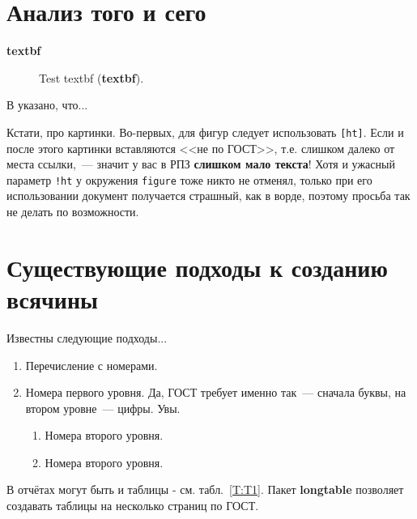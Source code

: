 \documentclass[utf8]{G7-32} %
\newcommand{\Code}[1]{\textbf{#1}}
\begin{document}
\section{Анализ того и сего}

\textbf{textbf}

\begin{figure}
\centering
\caption{Test textbf (\textbf{textbf}).}
\label{fig:dia}
\end{figure}


В \cite{Pup99} указано, что...

Кстати, про картинки. Во-первых, для фигур следует использовать \texttt{[ht]}. Если и после этого картинки вставляются <<не по ГОСТ>>, т.е. слишком далеко от места ссылки,~--- значит у вас в РПЗ \textbf{слишком мало текста}! Хотя и ужасный параметр \texttt{!ht} у окружения \texttt{figure} тоже никто не отменял, только при его использовании документ получается страшный, как в ворде, поэтому просьба так не делать по возможности.


\section{Существующие подходы к созданию всячины}

Известны следующие подходы...

\begin{enumerate}
\item Перечисление с номерами.
\item Номера первого уровня. Да, ГОСТ требует именно так~--- сначала буквы, на втором уровне~--- цифры. Увы.
\begin{enumerate}
\item Номера второго уровня.
\item Номера второго уровня.
\end{enumerate}
\end{enumerate}


В отчётах могут быть и таблицы - см. табл.~\ref{T:T1}. Пакет \Code{longtable} позволяет создавать таблицы на несколько страниц по ГОСТ.
\end{document}
